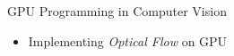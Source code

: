 \documentclass{beamer}
\begin{document}
\begin{frame}{GPU Programming in Computer Vision}
	\begin{itemize}
		\item Implementing \textit{Optical Flow} on GPU\\
		\begin{figure}
			\centering
			\subfigure{
}
\end{figure}
\end{itemize}
\end{frame}
\end{document}

